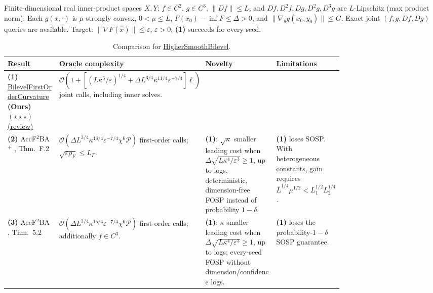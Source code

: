 \begin{table}[tp]
\centering
\caption{Comparison for \href{https://github.com/k3nfalt/longtails/blob/main/LongTails/Setups/HigherSmoothBilevel.lean}{HigherSmoothBilevel}.}\label{tab:HigherSmoothBilevel}
\parbox{\linewidth}{\footnotesize Finite-dimensional real inner-product spaces $X,Y$; $f\in C^2$, $g\in C^3$, $\|Df\|\le L$, and $Df,D^2f,Dg,D^2g,D^3g$ are $L$-Lipschitz (max product norm). Each $g(x,\cdot)$ is $\mu$-strongly convex, $0<\mu\le L$, $F(x_0)-\inf F\le\Delta>0$, and $\|\nabla_y g(x_0,y_0)\|\le G$. Exact joint $(f,g,Df,Dg)$ queries are available. Target: $\|\nabla F(\hat x)\|\le\varepsilon$, $\varepsilon>0$; \textbf{(1)} succeeds for every seed.}\par\smallskip
\begin{threeparttable}
\footnotesize
\setlength{\tabcolsep}{4pt}\renewcommand{\arraystretch}{1.25}
\begin{tabularx}{\linewidth}{@{}>{\raggedright\arraybackslash}p{0.20\linewidth}>{\raggedright\arraybackslash}p{0.32\linewidth}>{\raggedright\arraybackslash}p{0.25\linewidth}>{\raggedright\arraybackslash}X@{}}
\toprule
\textbf{Result} & \textbf{Oracle complexity} & \textbf{Novelty} & \textbf{Limitations} \\
\midrule
\textbf{(1)} \href{https://github.com/k3nfalt/longtails/blob/main/LongTails/Theorems/BilevelFirstOrderCurvature.lean}{Bilevel\allowbreak First\allowbreak Order\allowbreak Curvature} \textbf{(Ours)} $(\star\star\star)$ \href{https://github.com/k3nfalt/longtails/blob/main/scripts/reviews/BilevelFirstOrderCurvature.md}{(review)} & $\mathcal{O}\!\left(1+[(L\kappa^3/\varepsilon)^{1/4}+\Delta L^{3/4}\kappa^{11/4}\varepsilon^{-7/4}]\ell\right)$ joint calls, including inner solves. & & \\
\midrule[1.2pt]
\textbf{(2)} AccF$^2$BA$^+$ \citep{hsbChenJiZhangV4}, Thm.~F.2 & $\mathcal{O}(\Delta L^{3/4}\kappa^{13/4}\varepsilon^{-7/4}\chi^6\mathcal P)$ first-order calls; $\sqrt{\varepsilon\rho_F}\le L_F$. & \textbf{(1)}: $\sqrt\kappa$ smaller leading cost when $\Delta\sqrt{L\kappa^4/\varepsilon^3}\ge1$, up to logs; deterministic, dimension-free FOSP instead of probability $1-\delta$. & \textbf{(1)} loses SOSP. With heterogeneous constants, gain requires $\bar L^{1/4}\mu^{1/2}<L_1^{1/2}L_2^{1/4}$. \\
\midrule
\textbf{(3)} AccF$^2$BA \citep{hsbChenMaZhangV5}, Thm.~5.2 & $\mathcal{O}(\Delta L^{3/4}\kappa^{15/4}\varepsilon^{-7/4}\chi^6\mathcal P)$ first-order calls; additionally $f\in C^3$. & \textbf{(1)}: $\kappa$ smaller leading cost when $\Delta\sqrt{L\kappa^4/\varepsilon^3}\ge1$, up to logs; every-seed FOSP without dimension/confidence logs. & \textbf{(1)} loses the probability-$1-\delta$ SOSP guarantee. \\

\end{tabularx}
\end{threeparttable}
\end{table}
